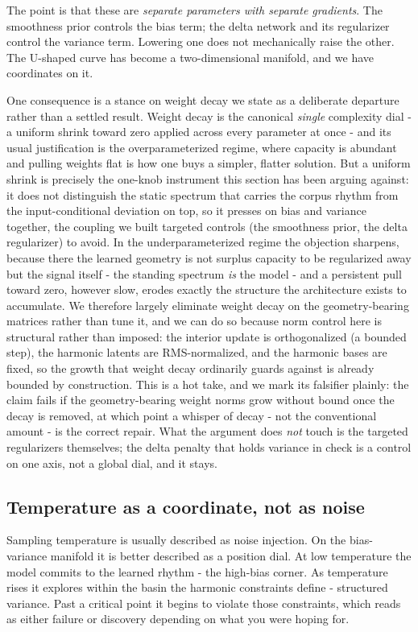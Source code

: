 The point is that these are \textit{separate parameters with separate gradients}. The smoothness prior controls the bias term; the delta network and its regularizer control the variance term. Lowering one does not mechanically raise the other. The U-shaped curve has become a two-dimensional manifold, and we have coordinates on it.

One consequence is a stance on weight decay we state as a deliberate departure rather than a settled result. Weight decay is the canonical \textit{single} complexity dial - a uniform shrink toward zero applied across every parameter at once - and its usual justification is the overparameterized regime, where capacity is abundant and pulling weights flat is how one buys a simpler, flatter solution. But a uniform shrink is precisely the one-knob instrument this section has been arguing against: it does not distinguish the static spectrum that carries the corpus rhythm from the input-conditional deviation on top, so it presses on bias and variance together, the coupling we built targeted controls (the smoothness prior, the delta regularizer) to avoid. In the underparameterized regime the objection sharpens, because there the learned geometry is not surplus capacity to be regularized away but the signal itself - the standing spectrum \textit{is} the model - and a persistent pull toward zero, however slow, erodes exactly the structure the architecture exists to accumulate. We therefore largely eliminate weight decay on the geometry-bearing matrices rather than tune it, and we can do so because norm control here is structural rather than imposed: the interior update is orthogonalized (a bounded step), the harmonic latents are RMS-normalized, and the harmonic bases are fixed, so the growth that weight decay ordinarily guards against is already bounded by construction. This is a hot take, and we mark its falsifier plainly: the claim fails if the geometry-bearing weight norms grow without bound once the decay is removed, at which point a whisper of decay - not the conventional amount - is the correct repair. What the argument does \textit{not} touch is the targeted regularizers themselves; the delta penalty that holds variance in check is a control on one axis, not a global dial, and it stays.

\subsection{Temperature as a coordinate, not as noise}

Sampling temperature is usually described as noise injection. On the bias-variance manifold it is better described as a position dial. At low temperature the model commits to the learned rhythm - the high-bias corner. As temperature rises it explores within the basin the harmonic constraints define - structured variance. Past a critical point it begins to violate those constraints, which reads as either failure or discovery depending on what you were hoping for.

